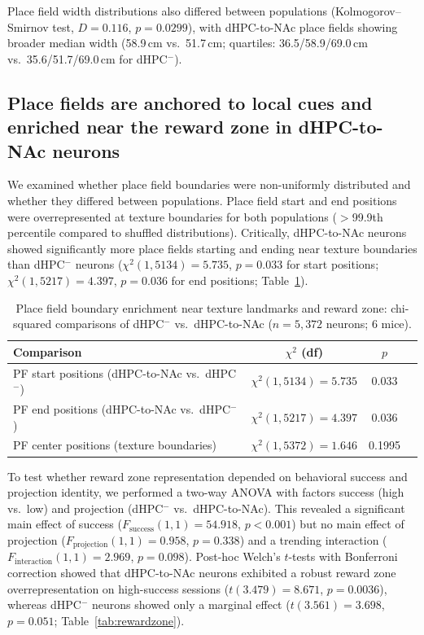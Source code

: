 \documentclass[11pt]{article}
\begin{document}
Place field width distributions also differed between populations (Kolmogorov--Smirnov test, $D=0.116$, $p=0.0299$), with dHPC-to-NAc place fields showing broader median width (58.9\,cm vs.\ 51.7\,cm; quartiles: 36.5/58.9/69.0\,cm vs.\ 35.6/51.7/69.0\,cm for dHPC$^{-}$).

\subsection{Place fields are anchored to local cues and enriched near the reward zone in dHPC-to-NAc neurons}

We examined whether place field boundaries were non-uniformly distributed and whether they differed between populations. Place field start and end positions were overrepresented at texture boundaries for both populations ($>$99.9th percentile compared to shuffled distributions). Critically, dHPC-to-NAc neurons showed significantly more place fields starting and ending near texture boundaries than dHPC$^{-}$ neurons ($\chi^{2}(1, 5134)=5.735$, $p=0.033$ for start positions; $\chi^{2}(1, 5217)=4.397$, $p=0.036$ for end positions; Table~\ref{tab:boundaries}).

\begin{table}[H]
\centering
\caption{Place field boundary enrichment near texture landmarks and reward zone: chi-squared comparisons of dHPC$^{-}$ vs.\ dHPC-to-NAc ($n=5{,}372$ neurons; 6 mice).}
\label{tab:boundaries}
\begin{tabular}{lccc}
\toprule
Comparison & $\chi^{2}$ (df) & $p$ \\
\midrule
PF start positions (dHPC-to-NAc vs.\ dHPC$^{-}$) & $\chi^{2}(1, 5134)=\mathbf{5.735}$ & 0.033 \\
PF end positions (dHPC-to-NAc vs.\ dHPC$^{-}$) & $\chi^{2}(1, 5217)=\mathbf{4.397}$ & 0.036 \\
PF center positions (texture boundaries) & $\chi^{2}(1, 5372)=1.646$ & 0.1995 \\
\bottomrule
\end{tabular}
\end{table}

To test whether reward zone representation depended on behavioral success and projection identity, we performed a two-way ANOVA with factors success (high vs.\ low) and projection (dHPC$^{-}$ vs.\ dHPC-to-NAc). This revealed a significant main effect of success ($F_{\text{success}}(1,1)=54.918$, $p<0.001$) but no main effect of projection ($F_{\text{projection}}(1,1)=0.958$, $p=0.338$) and a trending interaction ($F_{\text{interaction}}(1,1)=2.969$, $p=0.098$). Post-hoc Welch's $t$-tests with Bonferroni correction showed that dHPC-to-NAc neurons exhibited a robust reward zone overrepresentation on high-success sessions ($t(3.479)=8.671$, $p=0.0036$), whereas dHPC$^{-}$ neurons showed only a marginal effect ($t(3.561)=3.698$, $p=0.051$; Table~\ref{tab:rewardzone}).
\end{document}
